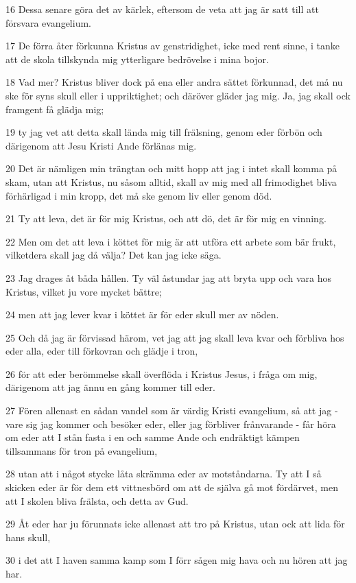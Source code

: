 \par 16 Dessa senare göra det av kärlek, eftersom de veta att jag är satt till att försvara evangelium.
\par 17 De förra åter förkunna Kristus av genstridighet, icke med rent sinne, i tanke att de skola tillskynda mig ytterligare bedrövelse i mina bojor.
\par 18 Vad mer? Kristus bliver dock på ena eller andra sättet förkunnad, det må nu ske för syns skull eller i uppriktighet; och däröver gläder jag mig. Ja, jag skall ock framgent få glädja mig;
\par 19 ty jag vet att detta skall lända mig till frälsning, genom eder förbön och därigenom att Jesu Kristi Ande förlänas mig.
\par 20 Det är nämligen min trängtan och mitt hopp att jag i intet skall komma på skam, utan att Kristus, nu såsom alltid, skall av mig med all frimodighet bliva förhärligad i min kropp, det må ske genom liv eller genom död.
\par 21 Ty att leva, det är för mig Kristus, och att dö, det är för mig en vinning.
\par 22 Men om det att leva i köttet för mig är att utföra ett arbete som bär frukt, vilketdera skall jag då välja? Det kan jag icke säga.
\par 23 Jag drages åt båda hållen. Ty väl åstundar jag att bryta upp och vara hos Kristus, vilket ju vore mycket bättre;
\par 24 men att jag lever kvar i köttet är för eder skull mer av nöden.
\par 25 Och då jag är förvissad härom, vet jag att jag skall leva kvar och förbliva hos eder alla, eder till förkovran och glädje i tron,
\par 26 för att eder berömmelse skall överflöda i Kristus Jesus, i fråga om mig, därigenom att jag ännu en gång kommer till eder.
\par 27 Fören allenast en sådan vandel som är värdig Kristi evangelium, så att jag - vare sig jag kommer och besöker eder, eller jag förbliver frånvarande - får höra om eder att I stån fasta i en och samme Ande och endräktigt kämpen tillsammans för tron på evangelium,
\par 28 utan att i något stycke låta skrämma eder av motståndarna. Ty att I så skicken eder är för dem ett vittnesbörd om att de själva gå mot fördärvet, men att I skolen bliva frälsta, och detta av Gud.
\par 29 Åt eder har ju förunnats icke allenast att tro på Kristus, utan ock att lida för hans skull,
\par 30 i det att I haven samma kamp som I förr sågen mig hava och nu hören att jag har.

